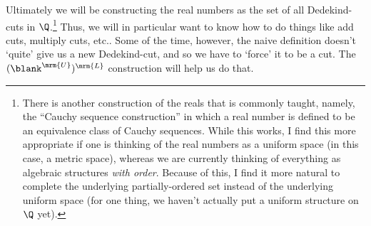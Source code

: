 Ultimately we will be constructing the real numbers as the set of all Dedekind-cuts in $\Q$.\footnote{There is another construction of the reals that is commonly taught, namely, the ``Cauchy sequence construction'' in which a real number is defined to be an equivalence class of Cauchy sequences.  While this works, I find this more appropriate if one is thinking of the real numbers as a uniform space (in this case, a metric space), whereas we are currently thinking of everything as algebraic structures \emph{with order}.  Because of this, I find it more natural to complete the underlying partially-ordered set instead of the underlying uniform space (for one thing, we haven't actually put a uniform structure on $\Q$ yet).}  Thus, we will in particular want to know how to do things like add cuts, multiply cuts, etc..  Some of the time, however, the naive definition doesn't `quite' give us a new Dedekind-cut, and so we have to `force' it to be a cut.  The $(\blank ^{\mrm{U}})^{\mrm{L}}$ construction will help us do that.

